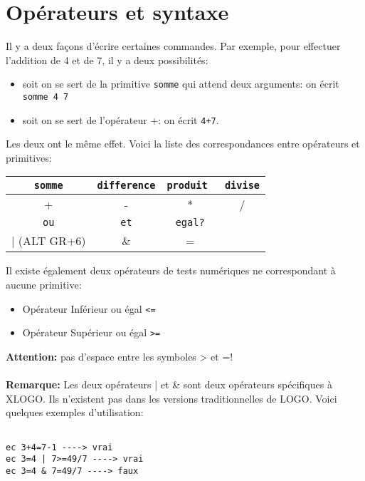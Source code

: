 \section{Opérateurs et syntaxe}
	Il y a deux façons d'écrire certaines commandes. Par exemple, pour effectuer l'addition de 4 et de 7, il y a deux possibilités:
	\begin{itemize}
	 \item soit on se sert de la primitive \texttt{somme} qui attend deux arguments: on écrit \texttt{somme 4 7 }
	\item soit on se sert de l'opérateur +: on écrit \texttt{4+7}.
	\end{itemize}
  Les deux ont le même effet. Voici la liste des correspondances entre opérateurs et primitives:\\
\begin{center}
\begin{tabular}{|c|c|c|c|}
\hline
\texttt{somme} & \texttt{difference} & \texttt{produit } & \texttt{divise}\\
\hline
+ & - & * & / \\
\hline
\texttt{ou} & \texttt{et}&\texttt{egal?}& \\
\hline
| (ALT GR+6) & \& &=&\\
\hline
\end{tabular}\end{center}
\vspace{0.25cm}
Il existe également deux opérateurs de tests numériques ne correspondant à aucune primitive:\begin{itemize}
 \item Opérateur \og Inférieur ou égal \fg \texttt{<=}
\item Opérateur \og Supérieur ou égal \fg \texttt{>=}
\end{itemize}
\textbf{Attention:} pas d'espace entre les symboles > et =! \\ \\
\textbf{Remarque:} Les deux opérateurs | et \& sont deux opérateurs spécifiques à XLOGO. Ils n'existent pas dans les versions traditionnelles de LOGO. Voici quelques exemples d'utilisation:
\begin{verbatim}

ec 3+4=7-1 ----> vrai
ec 3=4 | 7>=49/7 ----> vrai
ec 3=4 & 7=49/7 ----> faux
\end{verbatim}